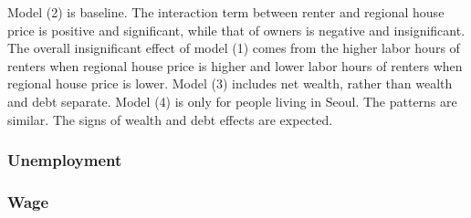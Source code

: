 \documentclass[12pt,letterpaper]{article}
\begin{document}
Model (2) is baseline. The interaction term between renter and regional house price is positive and significant, while that of owners is negative and insignificant. The overall insignificant effect of model (1) comes from the higher labor hours of renters when regional house price is higher and lower labor hours of renters when regional house price is lower. Model (3) includes net wealth, rather than wealth and debt separate. Model (4) is only for people living in Seoul. The patterns are similar. The signs of wealth and debt effects are expected. 
\newpage
\subsubsection{Unemployment}


\newpage
\subsubsection{Wage}


\newpage
\clearpage


\clearpage
\end{document}
